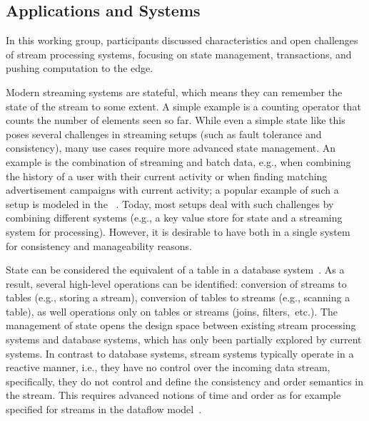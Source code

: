 \subsection{Applications and Systems}

In this working group, participants discussed characteristics and open
challenges of stream processing systems, focusing on state management,
transactions, and pushing computation to the edge.

 Modern streaming systems are stateful, which means they can remember the state
of the stream to some extent. A simple example is a counting operator that
counts the number of elements seen so far. While even a simple state like this
poses several challenges in streaming setups (such as fault tolerance and
consistency), many use cases require more advanced state management.
An example is the combination of streaming and batch data, e.g.,
when combining the history of a user with their current
activity or when finding matching advertisement campaigns with current activity;
a popular example of such a setup is modeled in the ~\cite{Chintapalli2016BenchmarkingSC}. Today, most setups deal with
such challenges by combining different systems (e.g., a key value store for
state and a streaming system for processing). However, it is desirable to have
both in a single system for consistency and manageability reasons.

State can be considered the equivalent of a table in a database
system~\cite{arasu_babu_widom_2006}. As a result, several high-level
operations can be identified: conversion of streams to tables (e.g., storing
a stream), conversion of tables to streams (e.g., scanning a table), as well
operations only on tables or streams (joins, filters,~etc.). The management of
state opens the design space between existing stream processing systems and
data\-base systems, which has only been partially explored by current systems.
In contrast to database systems, stream systems typically operate in a reactive
manner, i.e., they have no control over the incoming data stream, specifically,
they do not control and define the consistency and order semantics in the
stream. This requires advanced notions of time and order as for example
specified for streams in the dataflow model~\cite{akidau2015dataflow}.

